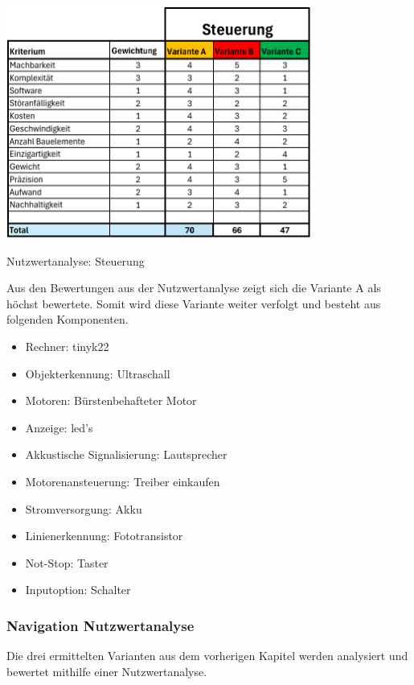 \begin{table}[H]
\centering
\includegraphics[width=0.75\textwidth]{assets/Nutzwertanalyse-ET.pdf}
\caption{Nutzwertanalyse: Steuerung}
\label{table:nutzwert-ET}
\end{table}

Aus den Bewertungen aus der Nutzwertanalyse zeigt sich die Variante A als höchst bewertete. Somit wird diese Variante weiter verfolgt und besteht aus folgenden Komponenten.

\begin{itemize}
    \item Rechner: \acrshort{tinyk22}
    \item Objekterkennung: Ultraschall
    \item Motoren: Bürstenbehafteter Motor
    \item Anzeige: \acrshort{led}'s
    \item Akkustische Signalisierung: Lautsprecher
    \item Motorenansteuerung: Treiber einkaufen
    \item Stromversorgung: Akku
    \item Linienerkennung: Fototransistor
    \item Not-Stop: Taster
    \item Inputoption: Schalter
\end{itemize}

\subsubsection{Navigation Nutzwertanalyse}

Die drei ermittelten Varianten aus dem vorherigen Kapitel werden analysiert und bewertet mithilfe einer Nutzwertanalyse.

